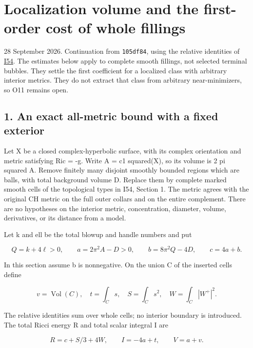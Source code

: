 \documentclass[
  10pt,
]{article}
\author{}
\date{}
\begin{document}
\hypertarget{localization-volume-and-the-first-order-cost-of-whole-fillings}{%
\section{Localization volume and the first-order cost of whole
fillings}\label{localization-volume-and-the-first-order-cost-of-whole-fillings}}

28 September 2026. Continuation from \texttt{105df84}, using the
relative identities of \href{20260928_relative_cell_cost.md}{I54}. The
estimates below apply to complete smooth fillings, not selected terminal
bubbles. They settle the first coefficient for a localized class with
arbitrary interior metrics. They do not extract that class from
arbitrary near-minimizers, so O11 remains open.

\hypertarget{an-exact-all-metric-bound-with-a-fixed-exterior}{%
\subsection{1. An exact all-metric bound with a fixed
exterior}\label{an-exact-all-metric-bound-with-a-fixed-exterior}}

Let X be a closed complex-hyperbolic surface, with its complex
orientation and metric satisfying Ric = -g. Write A = c1 squared(X), so
its volume is 2 pi squared A. Remove finitely many disjoint smoothly
bounded regions which are balls, with total background volume D. Replace
them by complete marked smooth cells of the topological types in I54,
Section 1. The metric agrees with the original CH metric on the full
outer collars and on the entire complement. There are no hypotheses on
the interior metric, concentration, diameter, volume, derivatives, or
its distance from a model.

Let k and ell be the total blowup and handle numbers and put

\[
 Q=k+4\ell>0,\qquad a=2\pi^2A-D>0,\qquad
 b=8\pi^2Q-4D,\qquad c=4a+b.
\]

In this section assume b is nonnegative. On the union C of the inserted
cells define

\[
 v=\operatorname{Vol}(C),\quad t=\int_Cs,\quad
 S=\int_Cs^2,\quad W=\int_C|W^+|^2.
\]

The relative identities sum over whole cells; no interior boundary is
introduced. The total Ricci energy R and total scalar integral I are

\[
 R=c+S/3+4W,\qquad I=-4a+t,\qquad V=a+v.                 \tag{1.1}
\]
\end{document}
